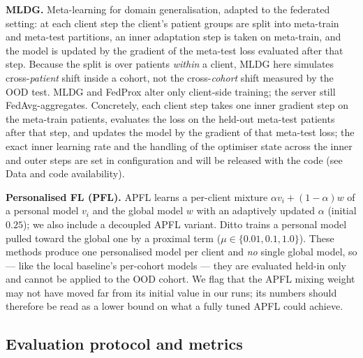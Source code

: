 \documentclass[10pt,letterpaper]{article}
\begin{document}
\textbf{MLDG.} Meta-learning for domain generalisation, adapted to the federated
setting: at each client step the client's patient groups are split into
meta-train and meta-test partitions, an inner adaptation step is taken on
meta-train, and the model is updated by the gradient of the meta-test loss
evaluated after that step. Because the split is over patients \emph{within} a
client, MLDG here simulates cross-\emph{patient} shift inside a cohort, not the
cross-\emph{cohort} shift measured by the OOD test. MLDG and FedProx alter only
client-side training; the server still FedAvg-aggregates. Concretely, each client
step takes one inner gradient step on the meta-train patients, evaluates the loss
on the held-out meta-test patients after that step, and updates the model by the
gradient of that meta-test loss; the exact inner learning rate and the handling
of the optimiser state across the inner and outer steps are set in configuration
and will be released with the code (see Data and code availability).

\textbf{Personalised FL (PFL).} APFL learns a per-client mixture
$\alpha v_i + (1-\alpha)w$ of a personal model $v_i$ and the global model $w$
with an adaptively updated $\alpha$ (initial $0.25$); we also include a decoupled
APFL variant. Ditto trains a personal model pulled toward the global one by a
proximal term ($\mu\in\{0.01,0.1,1.0\}$). These methods produce one personalised
model per client and \emph{no} single global model, so --- like the local
baseline's per-cohort models --- they are evaluated held-in only and cannot be
applied to the OOD cohort. We flag that the APFL mixing weight may not have moved
far from its initial value in our runs; its numbers should therefore be read as a
lower bound on what a fully tuned APFL could achieve.

\subsection*{Evaluation protocol and metrics}
\end{document}

